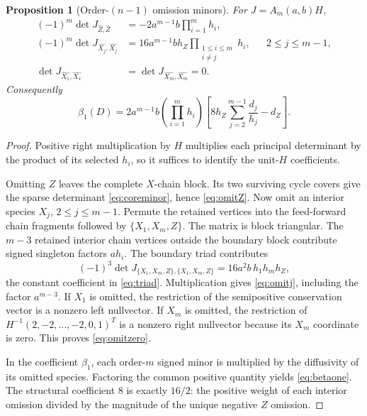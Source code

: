 \documentclass[11pt]{article}
\newtheorem{proposition}[theorem]{Proposition}
\theoremstyle{definition}
\newcommand{\1}{\mathbf 1}
\begin{document}
\begin{proposition}[Order-$(n-1)$ omission minors]\label{prop:omissions}
For $J=A_m(a,b)H$,
\begin{align}
(-1)^m\det J_{\widehat Z,\widehat Z}
 &=-2a^{m-1}b\prod_{i=1}^m h_i,\label{eq:omitZ}\\
(-1)^m\det J_{\widehat{X_j},\widehat{X_j}}
 &=16a^{m-1}bh_Z
   \prod_{\substack{1\le i\le m\\i\ne j}}h_i,
 &&2\le j\le m-1,\label{eq:omitj}\\
\det J_{\widehat{X_1},\widehat{X_1}}
 &=\det J_{\widehat{X_m},\widehat{X_m}}=0.\label{eq:omitzero}
\end{align}
Consequently
\begin{equation}\label{eq:betaone}
 \beta_1(D)=2a^{m-1}b\left(\prod_{i=1}^mh_i\right)
 \left[8h_Z\sum_{j=2}^{m-1}\frac{d_j}{h_j}-d_Z\right].
\end{equation}
\end{proposition}

\begin{proof}
Positive right multiplication by $H$ multiplies each principal determinant by
the product of its selected $h_i$, so it suffices to identify the unit-$H$
coefficients.

Omitting $Z$ leaves the complete $X$-chain block.  Its two surviving cycle
covers give the sparse determinant \eqref{eq:coreminor}, hence
\eqref{eq:omitZ}.  Now omit an interior species $X_j$, $2\le j\le m-1$.
Permute the retained vertices into the feed-forward chain fragments followed
by $\{X_1,X_m,Z\}$.  The matrix is block triangular.  The $m-3$ retained
interior chain vertices outside the boundary block contribute signed singleton
factors $a h_i$.  The boundary triad contributes
\[
 (-1)^3\det J_{\{X_1,X_m,Z\},\{X_1,X_m,Z\}}
 =16a^2b\,h_1h_mh_Z,
\]
the constant coefficient in \eqref{eq:triad}.  Multiplication gives
\eqref{eq:omitj}, including the factor $a^{m-3}$.  If $X_1$ is omitted, the
restriction of the semipositive conservation vector is a nonzero left
nullvector.  If $X_m$ is omitted, the restriction of
$H^{-1}(2,-2,\ldots,-2,0,1)^T$ is a nonzero right nullvector because its
$X_m$ coordinate is zero.  This proves \eqref{eq:omitzero}.

In the coefficient $\beta_1$, each order-$m$ signed minor is multiplied by the
diffusivity of its omitted species.  Factoring the common positive quantity
yields \eqref{eq:betaone}.  The structural coefficient $8$ is exactly
$16/2$: the positive weight of each interior omission divided by the magnitude
of the unique negative $Z$ omission.
\end{proof}
\end{document}
